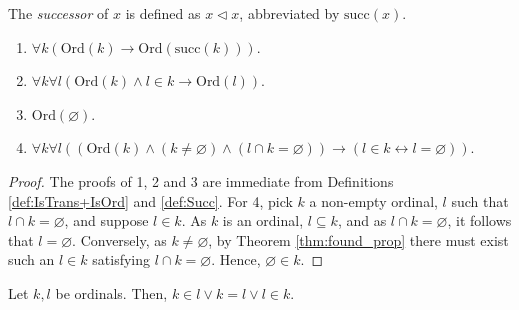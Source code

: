 \begin{definition}
    \label{def:Succ}
    \leanok
    The \textit{successor} of $x$ is defined as $x \lhd x$, abbreviated by $\text{succ}(x)$.
\end{definition}

\begin{lemma}
    \label{lem:succ_isOrd_if_isOrd+mem_of_ord_isOrd+...+empty_in_ord}
    \leanok
    \leavevmode
    \begin{enumerate}
        \item $\forall k(\text{Ord}(k) \rightarrow \text{Ord}(\text{succ}(k)))$.
        \item $\forall k \forall l(\text{Ord}(k) \land l \in k \rightarrow \text{Ord}(l))$.
        \item $\text{Ord}(\varnothing)$.
        \item $\forall k \forall l ((\text{Ord}(k) \land (k \neq \varnothing) \land (l \cap k = \varnothing))\rightarrow(l \in k \leftrightarrow l = \varnothing))$.
    \end{enumerate}
\end{lemma}

\begin{proof}
    \leanok
    \leavevmode
    The proofs of 1, 2 and 3 are immediate from Definitions \ref{def:IsTrans+IsOrd} and \ref{def:Succ}.
    For 4, pick $k$ a non-empty ordinal, $l$ such that $l \cap k = \varnothing$, and suppose $l \in k$.
    As $k$ is an ordinal, $l \subseteq k$, and as $l \cap k = \varnothing$, it follows that $l=\varnothing$.
    Conversely, as $k \neq \varnothing$, by Theorem \ref{thm:found_prop} there must exist such an $l \in k$ satisfying $l \cap k = \varnothing$.
    Hence, $\varnothing \in k$.
\end{proof}

\begin{theorem}
    \label{thm:compar_of_ord_ord}
    \leanok
    Let $k,l$ be ordinals. Then, $k \in l \lor k = l \lor l \in k$.
\end{theorem}

